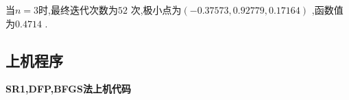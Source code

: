     当$ n=3 $时,最终迭代次数为$ 52 $ 次,极小点为$ (-0.37573,0.92779,0.17164) $ ,函数值为$ 0.4714 $ .

    \subsection{上机程序}
    \begin{center}
        \textbf{SR1,DFP,BFGS法上机代码}
    \end{center}

    

    \renewcommand{\refname}{参考文献}
    
    
